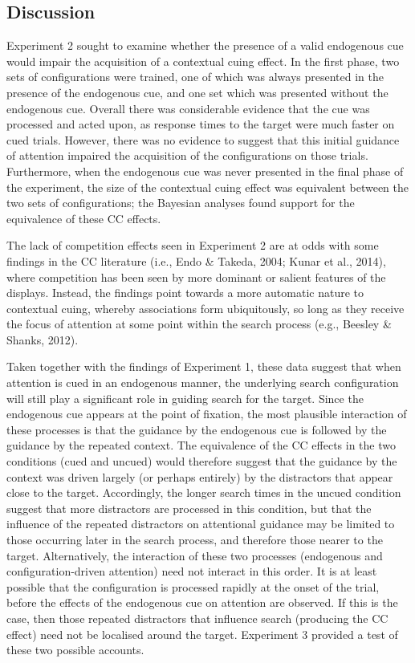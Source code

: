 \documentclass[
  man,
  floatsintext,
  longtable,
  nolmodern,
  notxfonts,
  notimes,
  colorlinks=true,linkcolor=blue,citecolor=blue,urlcolor=blue]{apa7}
\begin{document}
\subsection{Discussion}\label{discussion-1}

Experiment 2 sought to examine whether the presence of a valid
endogenous cue would impair the acquisition of a contextual cuing
effect. In the first phase, two sets of configurations were trained, one
of which was always presented in the presence of the endogenous cue, and
one set which was presented without the endogenous cue. Overall there
was considerable evidence that the cue was processed and acted upon, as
response times to the target were much faster on cued trials. However,
there was no evidence to suggest that this initial guidance of attention
impaired the acquisition of the configurations on those trials.
Furthermore, when the endogenous cue was never presented in the final
phase of the experiment, the size of the contextual cuing effect was
equivalent between the two sets of configurations; the Bayesian analyses
found support for the equivalence of these CC effects.

The lack of competition effects seen in Experiment 2 are at odds with
some findings in the CC literature (i.e., Endo \& Takeda, 2004; Kunar et
al., 2014), where competition has been seen by more dominant or salient
features of the displays. Instead, the findings point towards a more
automatic nature to contextual cuing, whereby associations form
ubiquitously, so long as they receive the focus of attention at some
point within the search process (e.g., Beesley \& Shanks, 2012).

Taken together with the findings of Experiment 1, these data suggest
that when attention is cued in an endogenous manner, the underlying
search configuration will still play a significant role in guiding
search for the target. Since the endogenous cue appears at the point of
fixation, the most plausible interaction of these processes is that the
guidance by the endogenous cue is followed by the guidance by the
repeated context. The equivalence of the CC effects in the two
conditions (cued and uncued) would therefore suggest that the guidance
by the context was driven largely (or perhaps entirely) by the
distractors that appear close to the target. Accordingly, the longer
search times in the uncued condition suggest that more distractors are
processed in this condition, but that the influence of the repeated
distractors on attentional guidance may be limited to those occurring
later in the search process, and therefore those nearer to the target.
Alternatively, the interaction of these two processes (endogenous and
configuration-driven attention) need not interact in this order. It is
at least possible that the configuration is processed rapidly at the
onset of the trial, before the effects of the endogenous cue on
attention are observed. If this is the case, then those repeated
distractors that influence search (producing the CC effect) need not be
localised around the target. Experiment 3 provided a test of these two
possible accounts.
\end{document}
